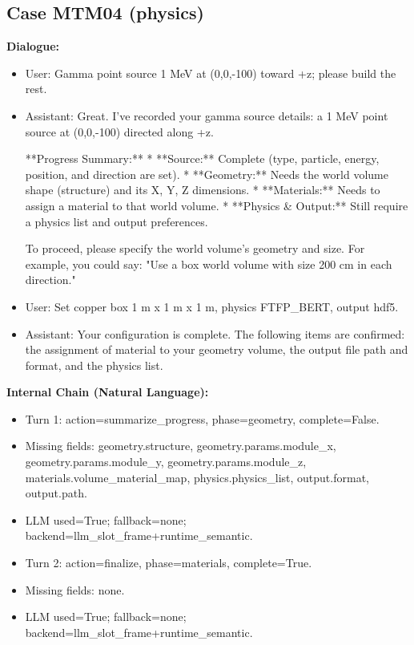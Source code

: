 \documentclass[11pt]{ctexart}
\begin{document}
\subsection{Case MTM04 (physics)}
\textbf{Dialogue:}
\begin{itemize}
\item User: Gamma point source 1 MeV at (0,0,-100) toward +z; please build the rest.
\item Assistant: Great. I've recorded your gamma source details: a 1 MeV point source at (0,0,-100) directed along +z.

**Progress Summary:**
*   **Source:** Complete (type, particle, energy, position, and direction are set).
*   **Geometry:** Needs the world volume shape (structure) and its X, Y, Z dimensions.
*   **Materials:** Needs to assign a material to that world volume.
*   **Physics \& Output:** Still require a physics list and output preferences.

To proceed, please specify the world volume's geometry and size. For example, you could say: "Use a box world volume with size 200 cm in each direction."
\item User: Set copper box 1 m x 1 m x 1 m, physics FTFP\_BERT, output hdf5.
\item Assistant: Your configuration is complete. The following items are confirmed: the assignment of material to your geometry volume, the output file path and format, and the physics list.
\end{itemize}
\textbf{Internal Chain (Natural Language):}
\begin{itemize}
\item Turn 1: action=summarize\_progress, phase=geometry, complete=False.
\item Missing fields: geometry.structure, geometry.params.module\_x, geometry.params.module\_y, geometry.params.module\_z, materials.volume\_material\_map, physics.physics\_list, output.format, output.path.
\item LLM used=True; fallback=none; backend=llm\_slot\_frame+runtime\_semantic.
\item Turn 2: action=finalize, phase=materials, complete=True.
\item Missing fields: none.
\item LLM used=True; fallback=none; backend=llm\_slot\_frame+runtime\_semantic.
\end{itemize}
\end{document}
